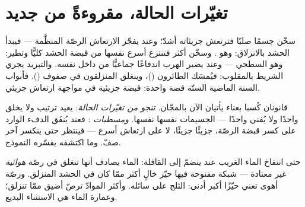 \section{تغيّرات الحالة، مقروءةً من جديد}

\begin{example}\label{ex:g7:states-of-matter:doors}
سخّن جسمًا صلبًا فترتعش جزيئاته أشدّ؛ وعند  يفجّر
الارتعاش الرصّة المنظَّمة --- فيبدأ الحشد بالانزلاق: وهو
. وسخّن  أكثر فتنتزع أسرع  نفسها من قبضة
الحشد كليًّا وتطير: وهو  السطحي --- وعند 
يصير الهرب اندفاعًا جماعيًّا من داخل  نفسه. والتبريد يجري
الشريط بالمقلوب: فيُمسَك الطائرون ()، وينغلق المنزلقون في
صفوف (). فأبواب السنة الماضية الستّة قصة واحدة: قبضة
جزيئية في مواجهة ارتعاش جزيئي.
\end{example}

\begin{example}\label{ex:g7:states-of-matter:free}
قانونان كُسبا بعناء يأتيان الآن بالمجّان. \emph{ تنجو من
تغيّرات الحالة}:  يعيد ترتيب  ولا يخلق واحدًا
ولا يُفني واحدًا --- الجسيمات نفسها  نفسها.
\emph{ومسطبات }: فعند  يُنفَق الدفء
الوارد على كسر قبضة الرصّة، جزيئًا جزيئًا، لا على ارتعاش أسرع
--- فينتظر  حتى ينكسر آخر صفّ. وما اكتشفه 
يفسّره النموذج.
\end{example}

\begin{remark}\label{rem:g7:states-of-matter:iceswell}
حتى انتفاخ الماء الغريب عند  ينضمّ إلى القافلة: 
الماء يصادف أنها تنغلق في رصّة \emph{هوائية} غير معتادة ---
شبكة مفتوحة فيها حيّز خالٍ أكثر ممّا كان في الحشد المنزلق.
ورصّة أهوى تعني حيّزًا أكبر  أدنى:  الثلج على سائله.
وأكثر الموادّ ترصّ أضيق ممّا تنزلق؛ وعمارة الماء هي الاستثناء
البديع.
\end{remark}


